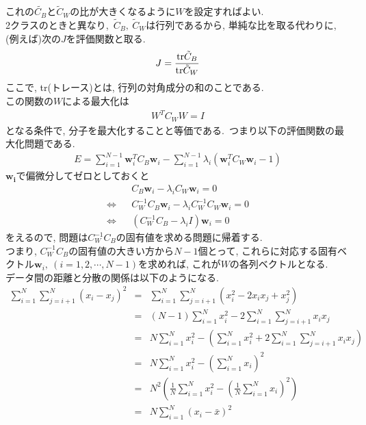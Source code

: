 \documentclass[dvipdfmx,a4j]{jsarticle}
\begin{document}
これの$\tilde{C_{B}}$と$\tilde{C}_{W}$の比が大きくなるように$W$を設定すればよい.\\
2クラスのときと異なり,\ $\tilde{C}_{B},\ \tilde{C}_{W}$は行列であるから, 単純な比を取る代わりに, (例えば)次の$J$を評価関数と取る.
\begin{eqnarray*}
    J=\frac{{\rm tr}\tilde{C}_{B}}{{\rm tr}\tilde{C}_{W}}
\end{eqnarray*}
ここで, tr(トレース)とは, 行列の対角成分の和のことである.\\
この関数の$W$による最大化は
\begin{eqnarray*}
    W^{T}C_{W}W=I
\end{eqnarray*}
となる条件で, 分子を最大化することと等価である.\ つまり以下の評価関数の最大化問題である.
\begin{eqnarray*}
    E=\sum_{i=1}^{N-1}\bm{w}_{i}^{T}C_{B}\bm{w}_{i}-\sum_{i=1}^{N-1}\lambda_{i}(\bm{w}_{i}^{T}C_{W}\bm{w}_{i}-1)
\end{eqnarray*}
$\bm{w_{i}}$で偏微分してゼロとしておくと
\begin{eqnarray*}
    &&C_{B}\bm{w}_{i}-\lambda_{i}C_{W}\bm{w}_{i}=0\\
    \Longleftrightarrow && C_{W}^{-1}C_{B}\bm{w}_{i}-\lambda_{i}C_{W}^{-1}C_{W}\bm{w}_{i}=0\\
    \Longleftrightarrow && (C_{W}^{-1}C_{B}-\lambda_{i}I)\bm{w}_{i}=0
\end{eqnarray*}
をえるので, 問題は$C_{W}^{-1}C_{B}$の固有値を求める問題に帰着する.\\
つまり, $C_{W}^{-1}C_{B}$の固有値の大きい方から$N-1$個とって, これらに対応する固有ベクトル$\bm{w}_{i},\ (i=1,2,\cdots,N-1)$を求めれば, これが$W$の各列ベクトルとなる.\\
データ間の距離と分散の関係は以下のようになる.
\begin{eqnarray*}
    \sum_{i=1}^{N}\sum_{j=i+1}^{N}(x_{i}-x_{j})^{2}&=& \sum_{i=1}^{N}\sum_{j=i+1}^{N}(x_{i}^{2}-2x_{i}x_{j}+x_{j}^{2})\\
                                                   &=& (N-1)\sum_{i=1}^{N}x_{i}^{2}-2\sum_{i=1}^{N}\sum_{j=i+1}^{N}x_{i}x_{j}\\
                                                   &=& N\sum_{i=1}^{N}x_{i}^{2}-\left(\sum_{i=1}^{N}x_{i}^{2}+2\sum_{i=1}^{N}\sum_{j=i+1}^{N}x_{i}x_{j}\right)\\
                                                   &=& N\sum_{i=1}^{N}x_{i}^{2}-\left(\sum_{i=1}^{N}x_{i}\right)^{2}\\
                                                   &=& N^{2}\left(\frac{1}{N}\sum_{i=1}^{N}x_{i}^{2}-\left(\frac{1}{N}\sum_{i=1}^{N}x_{i}\right)^{2}\right)\\
                                                   &=& N\sum_{i=1}^{N}(x_{i}-\bar{x})^{2}
\end{eqnarray*}
\end{document}
